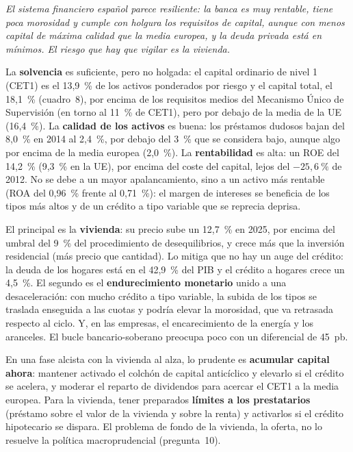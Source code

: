 \begin{examen}
\textit{El sistema financiero español parece resiliente: la banca es muy rentable, tiene poca morosidad y cumple con holgura los requisitos de capital, aunque con menos capital de máxima calidad que la media europea, y la deuda privada está en mínimos. El riesgo que hay que vigilar es la vivienda.}

La \textbf{solvencia} es suficiente, pero no holgada: el capital ordinario de nivel 1 (CET1) es el 13,9~\% de los activos ponderados por riesgo y el capital total, el 18,1~\% (cuadro~8), por encima de los requisitos medios del Mecanismo Único de Supervisión (en torno al 11~\% de CET1), pero por debajo de la media de la UE (16,4~\%). La \textbf{calidad de los activos} es buena: los préstamos dudosos bajan del 8,0~\% en 2014 al 2,4~\%, por debajo del 3~\% que se considera bajo, aunque algo por encima de la media europea (2,0~\%). La \textbf{rentabilidad} es alta: un ROE del 14,2~\% (9,3~\% en la UE), por encima del coste del capital, lejos del $-25{,}6~\%$ de 2012. No se debe a un mayor apalancamiento, sino a un activo más rentable (ROA del 0,96~\% frente al 0,71~\%): el margen de intereses se beneficia de los tipos más altos y de un crédito a tipo variable que se reprecia deprisa.

El principal es la \textbf{vivienda}: su precio sube un 12,7~\% en 2025, por encima del umbral del 9~\% del procedimiento de desequilibrios, y crece más que la inversión residencial (más precio que cantidad). Lo mitiga que no hay un auge del crédito: la deuda de los hogares está en el 42,9~\% del PIB y el crédito a hogares crece un 4,5~\%. El segundo es el \textbf{endurecimiento monetario} unido a una desaceleración: con mucho crédito a tipo variable, la subida de los tipos se traslada enseguida a las cuotas y podría elevar la morosidad, que va retrasada respecto al ciclo. Y, en las empresas, el encarecimiento de la energía y los aranceles. El bucle bancario-soberano preocupa poco con un diferencial de 45~pb.

En una fase alcista con la vivienda al alza, lo prudente es \textbf{acumular capital ahora}: mantener activado el colchón de capital anticíclico y elevarlo si el crédito se acelera, y moderar el reparto de dividendos para acercar el CET1 a la media europea. Para la vivienda, tener preparados \textbf{límites a los prestatarios} (préstamo sobre el valor de la vivienda y sobre la renta) y activarlos si el crédito hipotecario se dispara. El problema de fondo de la vivienda, la oferta, no lo resuelve la política macroprudencial (pregunta~10).
\end{examen}

